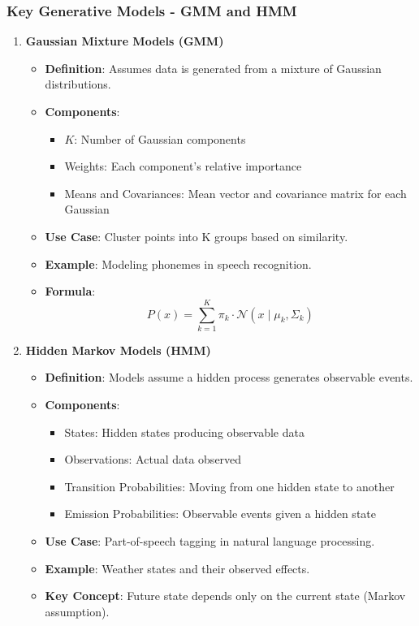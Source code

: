 \documentclass[aspectratio=169]{beamer}
\begin{document}
\begin{frame}[fragile]
    \frametitle{Key Generative Models - GMM and HMM}
    \begin{enumerate}
        \item \textbf{Gaussian Mixture Models (GMM)}  
        \begin{itemize}
            \item \textbf{Definition}: Assumes data is generated from a mixture of Gaussian distributions.
            \item \textbf{Components}:
            \begin{itemize}
                \item $K$: Number of Gaussian components
                \item Weights: Each component's relative importance
                \item Means and Covariances: Mean vector and covariance matrix for each Gaussian
            \end{itemize}
            \item \textbf{Use Case}: Cluster points into K groups based on similarity.
            \item \textbf{Example}: Modeling phonemes in speech recognition.
            \item \textbf{Formula}: 
            \begin{equation}
                P(x) = \sum_{k=1}^{K} \pi_k \cdot \mathcal{N}(x \mid \mu_k, \Sigma_k)
            \end{equation}
        \end{itemize}
        
        \item \textbf{Hidden Markov Models (HMM)}  
        \begin{itemize}
            \item \textbf{Definition}: Models assume a hidden process generates observable events.
            \item \textbf{Components}:
            \begin{itemize}
                \item States: Hidden states producing observable data
                \item Observations: Actual data observed
                \item Transition Probabilities: Moving from one hidden state to another
                \item Emission Probabilities: Observable events given a hidden state
            \end{itemize}
            \item \textbf{Use Case}: Part-of-speech tagging in natural language processing.
            \item \textbf{Example}: Weather states and their observed effects.
            \item \textbf{Key Concept}: Future state depends only on the current state (Markov assumption).
        \end{itemize}
    \end{enumerate}
\end{frame}
\end{document}

